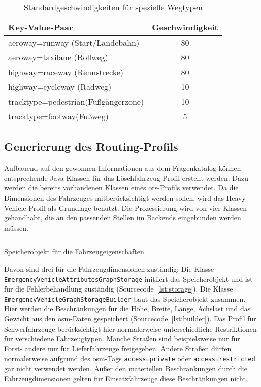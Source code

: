 \begin{table}
\caption{Standardgeschwindigkeiten für spezielle Wegtypen}
\label{tab:speedinfospecial}
\centering
\begin{tabular}{|l|c|}
\hline
\multicolumn{1}{|l|}{Key-Value-Paar} & \multicolumn{1}{c|}{Geschwindigkeit} \\
\hline
aeroway=runway (Start/Landebahn) & 80 \\
aeroway=taxilane (Rollweg) & 80 \\
highway=raceway (Rennstrecke) & 80 \\
highway=cycleway (Radweg) & 10 \\
tracktype=pedestrian(Fußgängerzone) & 10\\
tracktype=footway(Fußweg) & 5\\
\hline
\end{tabular}
\end{table}



\subsection{Generierung des Routing-Profils}
\label{backendGraphBuild}
Aufbauend auf den gewonnen Informationen aus dem Fragenkatalog können entsprechende Java-Klassen für das Löschfahrzeug-Profil erstellt werden.
Dazu werden die bereits vorhandenen Klassen eines \gls{ors}-Profils verwendet.
Da die Dimensionen des Fahrzeuges mitberücksichtigt werden sollen, wird das Heavy-Vehicle-Profil als Grundlage benutzt.
Die Prozessierung wird von vier Klassen gehandhabt, die an den passenden Stellen im Backends eingebunden werden müssen.

\begin{listing}[htb]
\centering
{}
\inputminted[fontsize=\footnotesize, breaklines, breakanywhere, firstline=26, lastline=53]{java}{../data/JavaFiles/EmergencyVehicleAttributesGraphStorage.java}
\caption{Speicherobjekt für die Fahrzeugeigenschaften}
\label{lst:storage}
\end{listing}

Davon sind drei für die Fahrzeugdimensionen zuständig:
\newline
Die Klasse \texttt{EmergencyVehicleAttributesGraphStorage} initiiert das Speicherobjekt und ist für die Fehlerbehandlung zuständig (Sourcecode~\ref{lst:storage}).
\newline
Die Klasse \texttt{EmergencyVehicleGraphStorageBuilder} baut das Speicherobjekt zusammen.
Hier werden die Beschränkungen für die Höhe, Breite, Länge, Achslast und das Gewicht aus den \gls{osm}-Daten gespeichert (Sourcecode~\ref{lst:builder}).
Das Profil für Schwerfahrzeuge berücksichtigt hier normalerweise unterschiedliche Restriktionen für verschiedene Fahrzeugtypen.
Manche Straßen sind beispielsweise nur für Forst- andere nur für Lieferfahrzeuge freigegeben.
Andere Straßen dürfen normalerweise aufgrund des \gls{osm}-Tags \texttt{access=private} oder \texttt{access=restricted} gar nicht verwendet werden.
Außer den materiellen Beschränkungen durch die Fahrzeugdimensionen gelten für Einsatzfahrzeuge diese Beschränkungen nicht.

